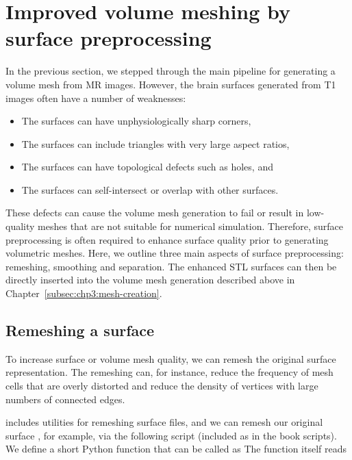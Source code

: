 \section{Improved volume meshing by surface preprocessing}
\label{sec:chp3:improved-volume-meshing}
In the previous section, we stepped through the main pipeline for
generating a volume mesh from MR images. However, the brain surfaces
generated from T1 images often have a number of weaknesses:
\begin{itemize}
\item The surfaces can have unphysiologically sharp corners,   
\item The surfaces can include triangles with very large aspect ratios, 
\item The surfaces can have topological defects such as holes, and
\item The surfaces can self-intersect or overlap with other surfaces.   
\end{itemize}
These defects can cause the volume mesh generation to fail or result
in low-quality meshes that are not suitable for numerical
simulation. Therefore, surface preprocessing is often required to
enhance surface quality prior to generating volumetric meshes. Here,
we outline three main aspects of surface preprocessing: remeshing,
smoothing and separation. The enhanced STL surfaces can then be
directly inserted into the volume mesh generation described above in
Chapter~\ref{subsec:chp3:mesh-creation}.

\subsection{Remeshing a surface}
\label{subsubsec:chp3:mesh-creation:remeshing}

To increase surface or volume mesh quality, we can remesh the original
surface representation. The remeshing can, for instance, reduce the
frequency of mesh cells that are overly distorted and reduce the
density of vertices with large numbers of connected edges.

\svmtk{} includes utilities for remeshing surface files, and we can
remesh our original surface , for example, via the
following script (included as  in
the book scripts). We define a short Python function
 that can be called as
%
%
\noindent The function itself reads

